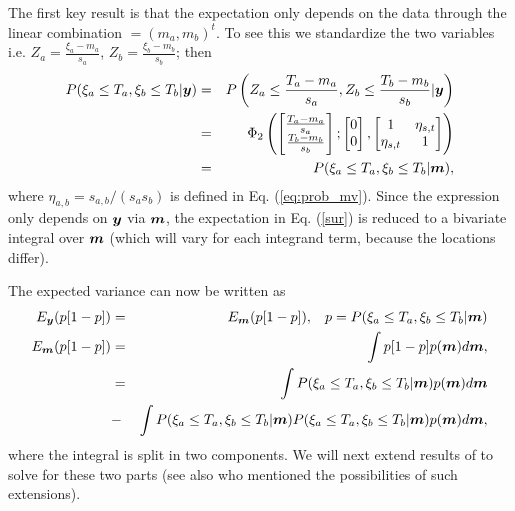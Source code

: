 \documentclass[aoas]{imsart}
\begin{document}
The first key result is that the expectation only depends on the data through the linear combination $\bm=(m_{a},m_{b})^t$. 
To see this we standardize the two variables i.e.
$Z_a=\frac{\xi_a-m_{a}}{s_{a}}$,
$Z_b=\frac{\xi_b-m_{b}}{s_{b}}$; 
then
\begin{eqnarray}
   P(\xi_a \leq T_a, \xi_b \leq T_b|\by) &=& P \left( Z_a \leq\frac{T_a-m_{a}}{s_{a}}, Z_b \leq\frac{T_b-m_{b}}{s_{b}}|\by \right) \nonumber \\
   &=& \Phi_2 \begin{pmatrix} 
\begin{bmatrix} \frac{T_a-m_{a}}{s_{a}}\\
\frac{T_b-m_{b}}{s_{b}}
\end{bmatrix};
 \begin{bmatrix} 0\\
0
\end{bmatrix},\begin{bmatrix}
1 & \eta_{s,t}  \\
\eta_{s,t}   & 1  
\end{bmatrix}\end{pmatrix} \nonumber \\
&=& P(\xi_a \leq T_a, \xi_b \leq T_b|\bm),
\end{eqnarray}
where $\eta_{a,b} =s_{a,b}/(s_{a} s_{b})$ is defined in Eq. (\ref{eq:prob_mv}).
Since the expression only depends on ${\boldsymbol y}$ via ${\boldsymbol m}$, the expectation in Eq. (\ref{sur}) is reduced to a bivariate integral over ${\boldsymbol m}$ (which will vary for each integrand term, because the locations differ). 

The expected variance can now be written as
\begin{eqnarray}\label{eq:var2}
E_{\by}(p[1-p]) &=& E_{\bm}(p[1-p]), \hspace{3mm} p=P(\xi_a \leq T_a, \xi_b \leq T_b|\bm) \nonumber \\
E_{\bm}(p[1-p]) & = & \int p[1-p] p(\bm) d\bm, \nonumber \\
 &=& \int P(\xi_a \leq T_a, \xi_b \leq T_b|\bm)  p(\bm) d\bm \nonumber  \\
&-& \int P(\xi_a \leq T_a, \xi_b \leq T_b|\bm) P(\xi_a \leq T_a, \xi_b \leq T_b|\bm) p(\bm) d\bm, 
\end{eqnarray}
where the integral is split in two components.
We will next extend results of \cite{chevalier2014fast} to solve for these two parts (see also \cite{stroh} who mentioned the possibilities of such extensions). 
\end{document}
